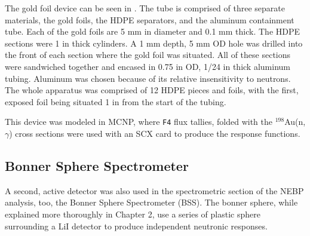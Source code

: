 The gold foil device can be seen in .
The tube is comprised of three separate materials, the gold foils, the HDPE separators, and the aluminum containment tube.
Each of the gold foils are 5 mm in diameter and 0.1 mm thick.
The HDPE sections were 1 in thick cylinders.
A 1 mm depth, 5 mm OD hole was drilled into the front of each section where the gold foil was situated.
All of these sections were sandwiched together and encased in 0.75 in OD, 1/24 in thick aluminum tubing.
Aluminum was chosen because of its relative insensitivity to neutrons.
The whole apparatus was comprised of 12 HDPE pieces and foils, with the first, exposed foil being situated 1 in from the start of the tubing.

This device was modeled in MCNP, where {\tt F4} flux tallies, folded with the $^{198}$Au(n,$\gamma$) cross sections were used with an SCX card to produce the response functions.

\subsection{Bonner Sphere Spectrometer}

A second, active detector was also used in the spectrometric section of the NEBP analysis, too, the Bonner Sphere Spectrometer (BSS).
The bonner sphere, while explained more thoroughly in Chapter 2, use a series of plastic sphere surrounding a LiI detector to produce independent neutronic responses.

